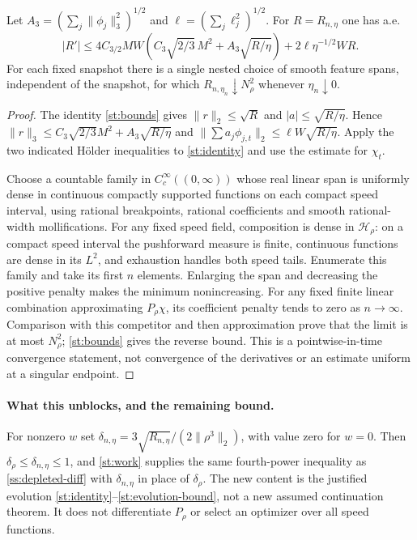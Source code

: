 \begin{corollary}\label{st:evolution}
Let $A_3=(\sum_j\|\phi_j\|_3^2)^{1/2}$ and
$\ell=(\sum_j\ell_j^2)^{1/2}$. For $R=R_{n,\eta}$ one has a.e.
\begin{equation}\label{st:evolution-bound}
 |R'|\le 4C_{3/2}MW
       \left(C_3\sqrt{2/3}\,M^2+A_3\sqrt{R/\eta}\right)
       +2\ell\eta^{-1/2}WR.
\end{equation}
For each fixed snapshot there is a single nested choice of smooth
feature spans, independent of the snapshot, for which
$R_{n,\eta_n}\downarrow N_\rho^2$ whenever $\eta_n\downarrow0$.
\end{corollary}
\begin{proof}
The identity \eqref{st:bounds} gives $\|r\|_2\le\sqrt R$ and
$|a|\le\sqrt{R/\eta}$. Hence
$\|r\|_3\le C_3\sqrt{2/3}M^2+A_3\sqrt{R/\eta}$ and
$\|\sum a_j\phi_{j,t}\|_2\le\ell W\sqrt{R/\eta}$.
Apply the two indicated H\"older inequalities to \eqref{st:identity}
and use the estimate for $\chi_t$.

Choose a countable family in $C_c^\infty((0,\infty))$ whose real
linear span is uniformly dense in continuous compactly supported
functions on each compact speed interval, using rational breakpoints,
rational coefficients and smooth rational-width mollifications.
For any fixed speed field, composition is dense in $\mathcal H_\rho$:
on a compact speed interval the pushforward measure is finite, continuous
functions are dense in its $L^2$, and exhaustion handles both speed tails.
Enumerate this family and take its first $n$ elements. Enlarging the
span and decreasing the positive penalty makes the minimum nonincreasing.
For any fixed finite linear combination approximating $P_\rho\chi$,
its coefficient penalty tends to zero as $n\to\infty$.
Comparison with this competitor and then approximation prove that the
limit is at most $N_\rho^2$; \eqref{st:bounds} gives the reverse bound.
This is a pointwise-in-time convergence statement, not convergence of
the derivatives or an estimate uniform at a singular endpoint.
\end{proof}

\paragraph{What this unblocks, and the remaining bound.}
For nonzero $w$ set
$\delta_{n,\eta}=3\sqrt{R_{n,\eta}}/(2\|\rho^3\|_2)$, with value
zero for $w=0$. Then $\delta_\rho\le\delta_{n,\eta}\le1$, and
\eqref{st:work} supplies the same fourth-power inequality as
\eqref{ss:depleted-diff} with $\delta_{n,\eta}$ in place of
$\delta_\rho$. The new content is the justified evolution
\eqref{st:identity}--\eqref{st:evolution-bound}, not a new assumed
continuation theorem. It does not differentiate $P_\rho$ or select an
optimizer over all speed functions.

